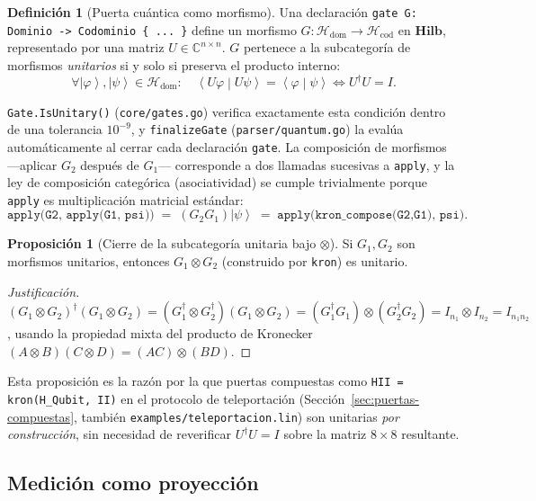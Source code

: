 \documentclass[12pt, a4paper, openany]{report}
\theoremstyle{definition}
\newtheorem{definition}{Definición}[chapter]
\newtheorem{proposition}{Proposición}[chapter]
\newcommand{\ket}[1]{\left|#1\right\rangle}
\newcommand{\braketnotation}[2]{\left\langle#1\middle|#2\right\rangle}
\begin{document}
\begin{definition}[Puerta cuántica como morfismo]
\label{def:gate-morfismo}
Una declaración \texttt{gate G: Dominio -> Codominio \{ ... \}} define un morfismo $G: \mathcal{H}_{\text{dom}} \to \mathcal{H}_{\text{cod}}$ en $\mathbf{Hilb}$, representado por una matriz $U \in \mathbb{C}^{n\times n}$. $G$ pertenece a la subcategoría de morfismos \emph{unitarios} si y solo si preserva el producto interno:
\[
  \forall \ket{\varphi},\ket{\psi} \in \mathcal{H}_{\text{dom}}: \quad \braketnotation{U\varphi}{U\psi} = \braketnotation{\varphi}{\psi} \iff U^\dagger U = I.
\]
\end{definition}

\texttt{Gate.IsUnitary()} (\texttt{core/gates.go}) verifica exactamente esta condición dentro de una tolerancia $10^{-9}$, y \texttt{finalizeGate} (\texttt{parser/quantum.go}) la evalúa automáticamente al cerrar cada declaración \texttt{gate}. La composición de morfismos —aplicar $G_2$ después de $G_1$— corresponde a dos llamadas sucesivas a \texttt{apply}, y la ley de composición categórica (asociatividad) se cumple trivialmente porque \texttt{apply} es multiplicación matricial estándar:
\[
  \texttt{apply(G2, apply(G1, psi))} \;=\; (G_2 G_1)\ket{\psi} \;=\; \texttt{apply(kron\_compose(G2,G1), psi)}.
\]

\begin{proposition}[Cierre de la subcategoría unitaria bajo $\otimes$]
\label{prop:unitary-closed}
Si $G_1, G_2$ son morfismos unitarios, entonces $G_1 \otimes G_2$ (construido por \texttt{kron}) es unitario.
\end{proposition}
\begin{proof}[Justificación]
$(G_1\otimes G_2)^\dagger(G_1\otimes G_2) = (G_1^\dagger \otimes G_2^\dagger)(G_1\otimes G_2) = (G_1^\dagger G_1)\otimes(G_2^\dagger G_2) = I_{n_1}\otimes I_{n_2} = I_{n_1 n_2}$, usando la propiedad mixta del producto de Kronecker $(A\otimes B)(C\otimes D) = (AC)\otimes(BD)$.
\end{proof}

Esta proposición es la razón por la que puertas compuestas como \texttt{HII = kron(H\_Qubit, II)} en el protocolo de teleportación (Sección~\ref{sec:puertas-compuestas}, también \texttt{examples/teleportacion.lin}) son unitarias \emph{por construcción}, sin necesidad de reverificar $U^\dagger U = I$ sobre la matriz $8\times 8$ resultante.

\subsection{Medición como proyección}
\end{document}
